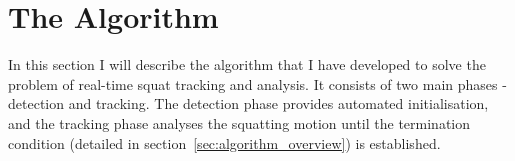 \section{The Algorithm}

In this section I will describe the algorithm that I have developed to solve the problem of real-time squat tracking and analysis. It consists of two main phases - detection and tracking. The detection phase provides automated initialisation, and the tracking phase analyses the squatting motion until the termination condition (detailed in section~\ref{sec:algorithm_overview}) is established.



